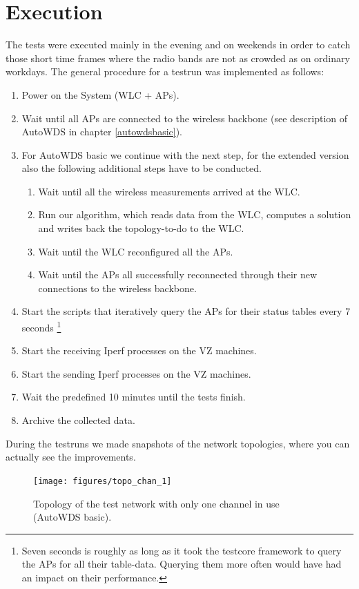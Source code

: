   \section{Execution}
    The tests were executed mainly in the evening and on weekends in order to catch those short time frames where the radio bands are not as crowded as on ordinary workdays.
    The general procedure for a testrun was implemented as follows:
    \begin{enumerate}
      \item Power on the System (\ac{WLC} + APs).
      \item Wait until all APs are connected to the wireless backbone (see description of AutoWDS in chapter \ref{autowdsbasic}).
      \item For AutoWDS basic we continue with the next step, for the extended version also the following additional steps have to be conducted.
	\begin{enumerate}
	 \item Wait until all the wireless measurements arrived at the \ac{WLC}.
	 \item Run our algorithm, which reads data from the \ac{WLC}, computes a solution and writes back the topology-to-do to the \ac{WLC}.
	 \item Wait until the \ac{WLC} reconfigured all the APs.
	 \item Wait until the APs all successfully reconnected through their new connections to the wireless backbone.
	\end{enumerate}
      \item Start the scripts that iteratively query the APs for their status tables every 7 seconds \footnote{Seven seconds is roughly as long as it took the testcore
      framework to query the APs for all their table-data. Querying them more often would have had an impact on their performance.}
      \item Start the receiving Iperf processes on the VZ machines.
      \item Start the sending Iperf processes on the VZ machines.
      \item Wait the predefined 10 minutes until the tests finish.
      \item Archive the collected data.
    \end{enumerate}
    
\newpage

    During the testruns we made snapshots of the network topologies, where you can actually see the improvements.    
    \begin{figure}[h!]
      \centering
	\texttt{[image: figures/topo\_chan\_1]}
	\caption{Topology of the test network with only one channel in use (AutoWDS basic).\protect\footnotemark }
      \label{fig:topo_chan_1}
    \end{figure}
    

